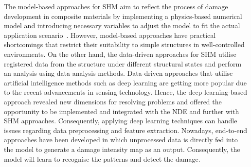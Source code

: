 The model-based approaches for SHM aim to reflect the process of damage development in composite materials by implementing a physics-based numerical model and introducing necessary variables to adjust the model to fit the actual application scenario~\cite{Wu2021}. 
However, model-based approaches have practical shortcomings that restrict their suitability to simple structures in well-controlled environments.
On the other hand, the data-driven approaches for SHM utilise registered data from the structure under different structural states and perform an analysis using data analysis methods.
Data-driven approaches that utilise artificial intelligence methods such as deep learning are getting more popular due to the recent advancements in sensing technology.
Hence, the deep learning-based approach revealed new dimensions for resolving problems and offered the opportunity to be implemented and integrated with the NDE and further with SHM approaches.
Consequently, applying deep learning techniques can handle issues regarding data preprocessing and feature extraction.
Nowadays, end-to-end approaches have been developed in which unprocessed data is directly fed into the model to generate a damage intensity map as an output.
Consequently, the model will learn to recognise the patterns and detect the damage.
%

%
